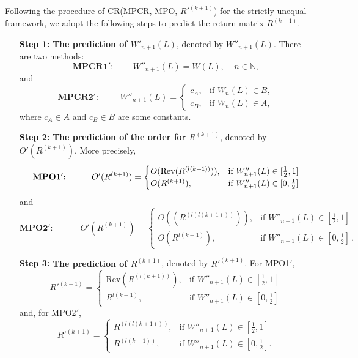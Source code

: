 \documentclass[11pt]{article}
\numberwithin{equation}{section}
\begin{document}
Following the procedure of  CR(MPCR, MPO, $R'^{(k+1)}$) for the strictly unequal framework, we adopt the following steps to 
predict the return matrix $R^{(k+1)}$. 
  
\begin{itemize}
\item[{\bf Step 1:}] {\bf The prediction of $W'_{n+1}(L)$}, denoted by $W''_{n+1}(L)$.  There are two methods: 
\begin{equation}
\textbf{MPCR1$'$:} \,\, ~~~~~~~~~W''_{n+1}(L)=W(L), ~~~~~n\in \mathbb{N},
\end{equation}
and
\begin{equation}
\textbf{MPCR2$'$:} \,\, ~~~~~~~~~~W''_{n+1}(L)=\begin{cases}
c_A, &\text{if }W_n(L)\in B,\\
c_B, &\text{if }W_n(L)\in A,
\end{cases}
\end{equation}
where $c_A\in A$ and $c_B\in B$ are some  constants.


\item[{\bf Step 2:}]  {\bf The prediction of the order for $R^{(k+1)}$}, denoted by $O'(R^{(k+1)})$. More precisely, 
\begin{equation*}
\textbf{MPO1$'$:} \,\,~~~~~~~~ O'(R^{(k+1)})=\begin{cases}
O(\mbox{\mbox{Rev}}(R^{(l(k+1))})), &\text{if }W''_{n+1}(L)\in [\frac{1}{2},1]\\
O(R^{(k+1)}), &\text{if }W''_{n+1}(L)\in [0,\frac{1}{2}]
\end{cases}
\end{equation*}
and
\begin{equation*}
\textbf{MPO2$'$:} \,\, ~~~~~~~~~~~~~O'(R^{(k+1)})=\begin{cases}
O((R^{(l(l(k+1)))})), &\text{if }W''_{n+1}(L)\in [\frac{1}{2},1]\\
O(R^{l(k+1)}), &\text{if }W''_{n+1}(L)\in [0,\frac{1}{2}]\, .
\end{cases}
\end{equation*}
\item[{\bf Step 3:}] {\bf The prediction of $R^{(k+1)}$}, denoted by $R'^{(k+1)}$. 
For MPO1$'$,  
\begin{equation*}
R'^{(k+1)}=\begin{cases}
\mbox{Rev}(R^{(l(k+1))}), &\text{if }W''_{n+1}(L)\in [\frac{1}{2},1]\\
R^{l(k+1)}, &\text{if }W''_{n+1}(L)\in [0,\frac{1}{2}]
\end{cases}
\end{equation*}
and, for MPO2$'$,  
\begin{equation*}
R'^{(k+1)}=\begin{cases}
R^{(l(l(k+1)))}, &\text{if }W''_{n+1}(L)\in [\frac{1}{2},1]\\
R^{(l(k+1))}, &\text{if }W''_{n+1}(L)\in [0,\frac{1}{2}].
\end{cases}
\end{equation*}
\end{itemize}
\end{document}
